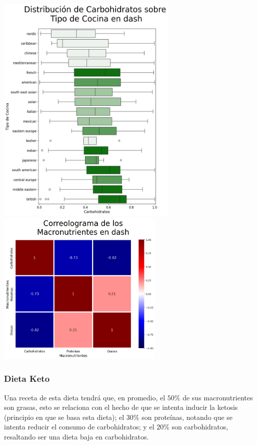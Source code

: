 \documentclass[12pt,a4paper]{article}
\begin{document}
            \begin{center}
                \includegraphics[width=0.65\textwidth]{Resources/2_03_plot_01_1.png}
                \includegraphics[width=0.6\textwidth]{Resources/2_03_plot_01_4.png}
            \end{center}

        \subsubsection{Dieta Keto}

            Una receta de esta dieta tendrá que, en promedio, el $50\%$ de 
            sus macronutrientes son grasas, esto se relaciona con el hecho de 
            que se intenta inducir la ketosis (principio en que se basa esta         
            dieta); el $30\%$ son proteínas, notando que se intenta reducir 
            el consumo de carbohidratos; y el $20\%$ son carbohidratos, 
            resaltando ser una dieta baja en carbohidratos.\\
\end{document}
